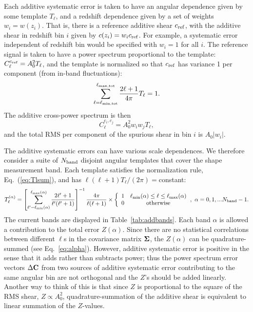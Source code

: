 \documentclass[aps,prd, amsmath,amssymb,superscriptaddress,showkeys,nofootinbib,reprint,preprintnumbers]{revtex4-1}
\begin{document}
\begin{widetext}
Each additive systematic error is taken to have an angular dependence
given by some template $T_\ell$, and a redshift dependence given by a
set of weights $w_i=w(z_i)$. That is, there is a reference additive
shear $c_{\rm ref}$, with the additive shear in redshift bin $i$ given
by $c(z_i) = w_ic_{\rm ref}$. For example, a systematic error
independent of redshift bin would be specified with $w_i=1$ for all
$i$. The reference signal is taken to have a power spectrum
proportional to the template: $C_\ell^{c_{\rm ref}} = A_0^2T_\ell$,
and the template is normalized so that $c_{\rm ref}$ has variance 1
per component (from in-band fluctuations):
\begin{equation}
\sum_{\ell=\ell_{\rm min,tot}}^{\ell_{\rm max,tot}} \frac{2\ell+1}{4\pi} T_\ell = 1.
\label{eq:Tlsum}
\end{equation}
The additive cross-power spectrum is then
\begin{equation}
C_\ell^{c_i,c_j} = A_0^2 w_iw_jT_\ell,
\end{equation}
and the total RMS per component of the spurious shear in bin $i$ is $A_0|w_i|$.

The additive systematic errors can have various scale dependences. We
therefore consider a suite of $N_{\rm band}$ disjoint angular
templates that cover the shape measurement band. Each template
satisfies the normalization rule, Eq.~(\ref{eq:Tlsum}), and has
$\ell(\ell+1)T_\ell/(2\pi)=$constant:
\begin{equation}
T_\ell^{(\alpha)} = \left[ \sum_{\ell'=\ell_{\rm min}(\alpha)}^{\ell_{\rm max}(\alpha)} \frac{2\ell'+1}{\ell'(\ell'+1)} \right]^{-1} \frac{4\pi}{\ell(\ell+1)}
\times\left\{ \begin{array}{cc} 1 & \ell_{\rm min}(\alpha)\le\ell\le\ell_{\rm max}(\alpha) \\ 0 & {\rm otherwise} \end{array} \right.\!,~\alpha=0,1,...N_{\rm band}-1.
\end{equation}
The current bands are displayed in Table~\ref{tab:addbands}. Each band
$\alpha$ is allowed a contribution to the total error
$Z(\alpha)$. Since there are no statistical correlations between
different $\ell$s in the covariance matrix ${\bf\Sigma}$, the
$Z(\alpha)$ can be quadrature-summed (see
Eq.~\ref{eq:alpha}). However, additive systematic error is positive in
the sense that it adds rather than subtracts power; thus the power
spectrum error vectors $\Delta{\bf C}$ from two sources of additive
systematic error contributing to the same angular bin are not
orthogonal and the $Z$'s should be added linearly. Another way to
think of this is that since $Z$ is proportional to the square of the
RMS shear, $Z\propto A_0^2$, quadrature-summation of the additive
shear is equivalent to linear summation of the $Z$-values.


\end{widetext}
\end{document}

